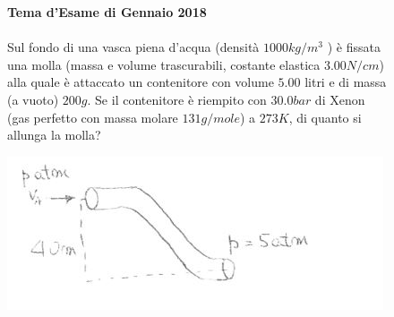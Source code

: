 \begin{figure}[h!]
    \textbf{Tema d'Esame di Gennaio 2018}\\ \\
    Sul fondo di una vasca piena d'acqua (densità $1000 kg/m^3$
    ) è fissata una molla (massa e volume trascurabili, costante elastica $3.00 N/cm$) alla quale è attaccato un contenitore con volume $5.00$ litri e di massa (a vuoto) $200 g$. Se il contenitore è riempito con $30.0 bar$ di Xenon (gas perfetto con massa molare $131 g/mole$) a $273 K$, di quanto si allunga la molla?
    \begin{center}
            \includegraphics[scale=1.1]{ES4/FEB042016.jpg}
        \end{center}
    \end{figure}